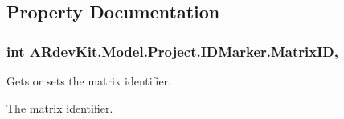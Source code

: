 \subsection{Property Documentation}
\hypertarget{class_a_rdev_kit_1_1_model_1_1_project_1_1_i_d_marker_aaa90db647a18c316b7c4de9dcf123170}{
\subsubsection[{Matrix\-I\-D}]{\setlength{\rightskip}{0pt plus 5cm}int A\-Rdev\-Kit.\-Model.\-Project.\-I\-D\-Marker.\-Matrix\-I\-D\hspace{0.3cm}{\ttfamily [get]}, {\ttfamily [set]}}}\label{class_a_rdev_kit_1_1_model_1_1_project_1_1_i_d_marker_aaa90db647a18c316b7c4de9dcf123170}


Gets or sets the matrix identifier. 

The matrix identifier. 